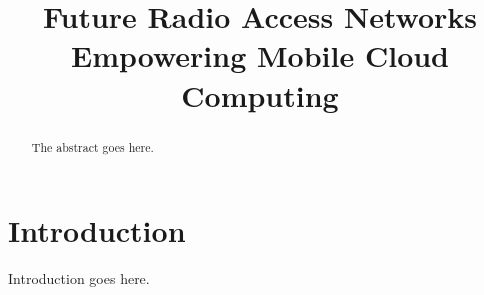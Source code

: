 \documentclass[conference]{IEEEtran}
\begin{document}
\title{Future Radio Access Networks Empowering Mobile Cloud Computing}

\author{
}

\maketitle

\begin{abstract}
The abstract goes here.
\end{abstract}

\section{Introduction}
Introduction goes here.
\end{document}
